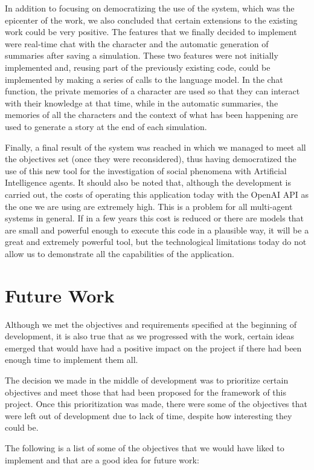In addition to focusing on democratizing the use of the system, which was the epicenter of the work, we also concluded that certain extensions to the existing work could be very positive. The features that we finally decided to implement were real-time chat with the character and the automatic generation of summaries after saving a simulation. These two features were not initially implemented and, reusing part of the previously existing code, could be implemented by making a series of calls to the language model. In the chat function, the private memories of a character are used so that they can interact with their knowledge at that time, while in the automatic summaries, the memories of all the characters and the context of what has been happening are used to generate a story at the end of each simulation.

Finally, a final result of the system was reached in which we managed to meet all the objectives set (once they were reconsidered), thus having democratized the use of this new tool for the investigation of social phenomena with Artificial Intelligence agents. It should also be noted that, although the development is carried out, the costs of operating this application today with the OpenAI API as the one we are using are extremely high. This is a problem for all multi-agent systems in general. If in a few years this cost is reduced or there are models that are small and powerful enough to execute this code in a plausible way, it will be a great and extremely powerful tool, but the technological limitations today do not allow us to demonstrate all the capabilities of the application.

\section*{Future Work}

Although we met the objectives and requirements specified at the beginning of development, it is also true that as we progressed with the work, certain ideas emerged that would have had a positive impact on the project if there had been enough time to implement them all.

The decision we made in the middle of development was to prioritize certain objectives and meet those that had been proposed for the framework of this project. Once this prioritization was made, there were some of the objectives that were left out of development due to lack of time, despite how interesting they could be.

The following is a list of some of the objectives that we would have liked to implement and that are a good idea for future work:
	
